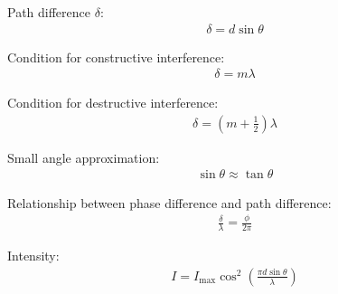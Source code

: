 \documentclass[a4paper,10pt]{report}
\begin{document}
Path difference $\delta$:
\begin{align*}
	\delta = d\sin\theta
\end{align*}

Condition for constructive interference:
\begin{align*}
	\delta = m\lambda
\end{align*}

Condition for destructive interference:
\begin{align*}
	\delta = (m+\frac{1}{2})\lambda
\end{align*}

Small angle approximation:
\begin{align*}
	\sin\theta \approx \tan\theta
\end{align*}

Relationship between phase difference and path difference:
\begin{align*}
	\frac{\delta}{\lambda} = \frac{\phi}{2\pi}
\end{align*}

Intensity:
\begin{align*}
	I = I_{\text{max}}\cos^2\left(\frac{\pi d \sin\theta}{\lambda}\right)
\end{align*}
\end{document}
